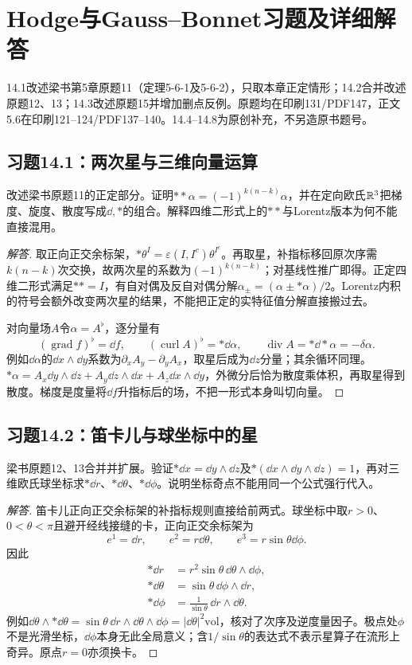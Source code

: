 \section{Hodge与Gauss--Bonnet习题及详细解答}
14.1改述梁书第5章原题11（定理5-6-1及5-6-2），只取本章正定情形；14.2合并改述原题12、13；14.3改述原题15并增加删点反例。原题均在印刷131/PDF147，正文5.6在印刷121--124/PDF137--140。14.4--14.8为原创补充，不另造原书题号。

\subsection*{习题14.1：两次星与三维向量运算}
改述梁书原题11的正定部分。证明$**\alpha=(-1)^{k(n-k)}\alpha$，并在定向欧氏$\mathbb{R}^3$把梯度、旋度、散度写成$\dd,*$的组合。解释四维二形式上的$**$与Lorentz版本为何不能直接混用。
\begin{proof}[解答]
取正向正交余标架，$*\theta^I=\varepsilon(I,I^c)\theta^{I^c}$。再取星，补指标移回原次序需$k(n-k)$次交换，故两次星的系数为$(-1)^{k(n-k)}$；对基线性推广即得。正定四维二形式满足$**=I$，有自对偶及反自对偶分解$\alpha_\pm=(\alpha\pm*\alpha)/2$。Lorentz内积的符号会额外改变两次星的结果，不能把正定的实特征值分解直接搬过去。

对向量场$A$令$\alpha=A^\flat$，逐分量有
\[
 (\operatorname{grad}f)^\flat=\dd f,\qquad
 (\operatorname{curl}A)^\flat=*\dd\alpha,\qquad
 \operatorname{div}A=*\dd*\alpha=-\delta\alpha.
\]
例如$\dd\alpha$的$\dd x\wedge\dd y$系数为$\partial_xA_y-\partial_yA_x$，取星后成为$\dd z$分量；其余循环同理。$*\alpha=A_x\dd y\wedge\dd z+A_y\dd z\wedge\dd x+A_z\dd x\wedge\dd y$，外微分后恰为散度乘体积，再取星得到散度。梯度是度量将$\dd f$升指标后的场，不把一形式本身叫切向量。
\end{proof}

\subsection*{习题14.2：笛卡儿与球坐标中的星}
梁书原题12、13合并并扩展。验证$*\dd x=\dd y\wedge\dd z$及$*(\dd x\wedge\dd y\wedge\dd z)=1$，再对三维欧氏球坐标求$*\dd r$、$*\dd\theta$、$*\dd\phi$。说明坐标奇点不能用同一个公式强行代入。
\begin{proof}[解答]
笛卡儿正向正交余标架的补指标规则直接给前两式。球坐标中取$r>0$、$0<\theta<\pi$且避开经线接缝的卡，正向正交余标架为
\[
 e^1=\dd r,\qquad e^2=r\dd\theta,\qquad e^3=r\sin\theta\dd\phi.
\]
因此
\begin{align*}
 *\dd r&=r^2\sin\theta\,\dd\theta\wedge\dd\phi,\\
 *\dd\theta&=\sin\theta\,\dd\phi\wedge\dd r,\\
 *\dd\phi&=\frac1{\sin\theta}\,\dd r\wedge\dd\theta.
\end{align*}
例如$\dd\theta\wedge*\dd\theta=\sin\theta\,\dd r\wedge\dd\theta\wedge\dd\phi=|\dd\theta|^2\mathrm{vol}$，核对了次序及逆度量因子。极点处$\phi$不是光滑坐标，$\dd\phi$本身无此全局意义；含$1/\sin\theta$的表达式不表示星算子在流形上奇异。原点$r=0$亦须换卡。
\end{proof}

